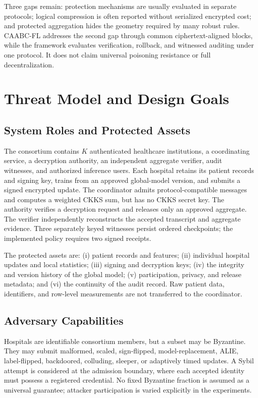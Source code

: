 \documentclass[conference]{IEEEtran}
\begin{document}
Three gaps remain: protection mechanisms are usually evaluated in separate
protocols; logical compression is often reported without serialized encrypted
cost; and protected aggregation hides the geometry required by many robust
rules. CAABC-FL addresses the second gap through common ciphertext-aligned
blocks, while the framework evaluates verification, rollback, and witnessed
auditing under one protocol. It does not claim universal poisoning resistance or
full decentralization.

\section{Threat Model and Design Goals}
\label{sec:threat-model}

\subsection{System Roles and Protected Assets}

The consortium contains $K$ authenticated healthcare institutions, a coordinating
service, a decryption authority, an independent aggregate verifier, audit
witnesses, and authorized inference users. Each hospital retains its patient
records and signing key, trains from an approved global-model version, and
submits a signed encrypted update. The coordinator admits protocol-compatible
messages and computes a weighted CKKS sum, but has no CKKS secret key. The
authority verifies a decryption request and releases only an approved aggregate.
The verifier independently reconstructs the accepted transcript and aggregate
evidence. Three separately keyed witnesses persist ordered checkpoints; the
implemented policy requires two signed receipts.

The protected assets are: (i) patient records and features; (ii) individual
hospital updates and local statistics; (iii) signing and decryption keys; (iv)
the integrity and version history of the global model; (v) participation,
privacy, and release metadata; and (vi) the continuity of the audit record. Raw
patient data, identifiers, and row-level measurements are not transferred to the
coordinator.

\subsection{Adversary Capabilities}

Hospitals are identifiable consortium members, but a subset may be Byzantine.
They may submit malformed, scaled, sign-flipped, model-replacement, ALIE,
label-flipped, backdoored, colluding, sleeper, or adaptively timed updates. A
Sybil attempt is considered at the admission boundary, where each accepted
identity must possess a registered credential. No fixed Byzantine fraction is
assumed as a universal guarantee; attacker participation is varied explicitly in
the experiments.
\end{document}
